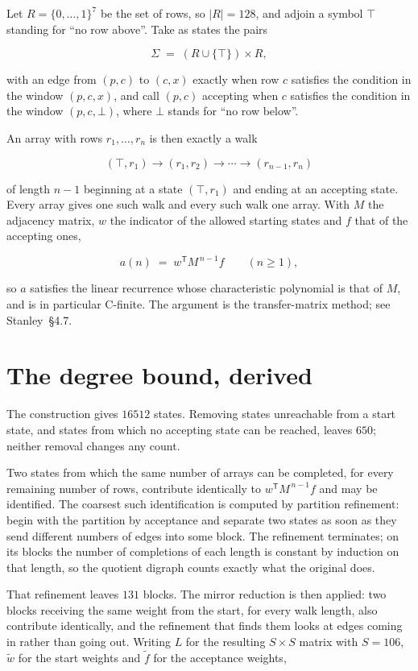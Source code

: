 \documentclass[11pt]{article}
\theoremstyle{definition}
\begin{document}
Let $R = \{0,\dots,1\}^{7}$ be the set of rows, so $|R| = 128$, and adjoin a symbol $\top$ standing for ``no row above''. Take as states the pairs

\[\Sigma \;=\; (R \cup \{\top\}) \times R,\]

with an edge from $(p,c)$ to $(c,x)$ exactly when row $c$ satisfies the condition in the window $(p,c,x)$, and call $(p,c)$ accepting when $c$ satisfies the condition in the window $(p,c,\bot)$, where $\bot$ stands for ``no row below''.

An array with rows $r_1,\dots,r_n$ is then exactly a walk

\[(\top,r_1) \to (r_1,r_2) \to \cdots \to (r_{n-1},r_n)\]

of length $n-1$ beginning at a state $(\top,r_1)$ and ending at an accepting state. Every array gives one such walk and every such walk one array. With $M$ the adjacency matrix, $w$ the indicator of the allowed starting states and $f$ that of the accepting ones,

\[a(n) \;=\; w^{\mathsf T} M^{\,n-1} f \qquad (n \ge 1),\]

so $a$ satisfies the linear recurrence whose characteristic polynomial is that of $M$, and is in particular C-finite. The argument is the transfer-matrix method; see Stanley~\S4.7.

\section{The degree bound, derived}

The construction gives $16512$ states. Removing states unreachable from a start state, and states from which no accepting state can be reached, leaves $650$; neither removal changes any count.

Two states from which the same number of arrays can be completed, for every remaining number of rows, contribute identically to $w^{\mathsf T}M^{\,n-1}f$ and may be identified. The coarsest such identification is computed by partition refinement: begin with the partition by acceptance and separate two states as soon as they send different numbers of edges into some block. The refinement terminates; on its blocks the number of completions of each length is constant by induction on that length, so the quotient digraph counts exactly what the original does.

That refinement leaves $131$ blocks. The mirror reduction is then applied: two blocks receiving the same weight from the start, for every walk length, also contribute identically, and the refinement that finds them looks at edges coming in rather than going out. Writing $L$ for the resulting $S \times S$ matrix with $S = 106$, $\tilde w$ for the start weights and $\tilde f$ for the acceptance weights,
\end{document}
